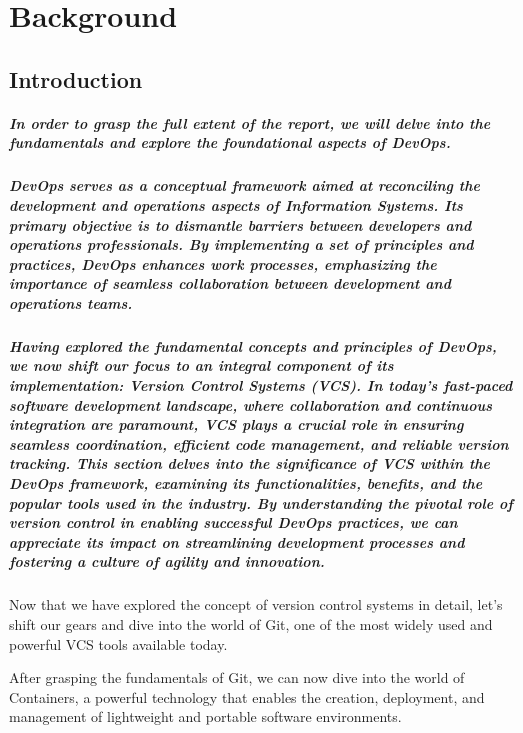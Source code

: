 \chapter{Background}

\section*{Introduction}
\paragraph{In order to grasp the full extent of the report, we will delve into the fundamentals and explore the foundational aspects of DevOps.}

\paragraph{DevOps serves as a conceptual framework aimed at reconciling the development and operations aspects of Information Systems. Its primary objective is to dismantle barriers between developers and operations professionals. By implementing a set of principles and practices, DevOps enhances work processes, emphasizing the importance of seamless collaboration between development and operations teams.\cite{diel2016communication}}

\paragraph{Having explored the fundamental concepts and principles of DevOps, we now shift our focus to an integral component of its implementation: Version Control Systems (VCS). In today's fast-paced software development landscape, where collaboration and continuous integration are paramount, VCS plays a crucial role in ensuring seamless coordination, efficient code management, and reliable version tracking. This section delves into the significance of VCS within the DevOps framework, examining its functionalities, benefits, and the popular tools used in the industry. By understanding the pivotal role of version control in enabling successful DevOps practices, we can appreciate its impact on streamlining development processes and fostering a culture of agility and innovation.}



Now that we have explored the concept of version control systems in detail, let's shift our gears and dive into the world of Git, one of the most widely used and powerful VCS tools available today.



After grasping the fundamentals of Git, we can now dive into the world of Containers, a powerful technology that enables the creation, deployment, and management of lightweight and portable software environments.









